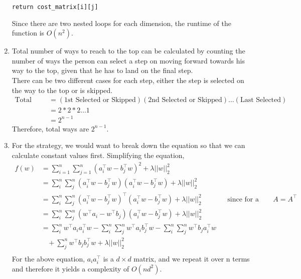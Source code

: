 \documentclass[12pt]{article}
\begin{document}
\begin{enumerate}[label=(\alph*)]
\begin{lstlisting}[basicstyle=\small]
    return cost_matrix[i][j]
\end{lstlisting}
Since there are two nested loops for each dimension, the runtime of the function is $O(n^2)$.\\
\linebreak
\item Total number of ways to reach to the top can be calculated by counting the number of ways the person can select a step on moving forward towards his way to the top, given that he has to land on the final step. \\
\linebreak
There can be two different cases for each step, either the step is selected on the way to the top or is skipped. \\
\begin{align*}
\text{Total ways} & = (\text{1st Selected or Skipped}) (\text{2nd Selected or Skipped}) \dots (\text{Last Selected}) \\ 
&= 2 * 2 * 2 \dots 1 \\
& = 2^{n-1}
\end{align*}
Therefore, total ways are $2^{n-1}$.\\
\linebreak
\item For the strategy, we would want to break down the equation so that we can calculate constant values first. Simplifying the equation, \\
\begin{align*}
f(w) & = \sum_{i=1}^{n}\sum_{j=1}^{n} (a_i^\top w - b_j^\top w)^2 + \lambda||w||_2^2 \\
& = \sum_i^n \sum_j^n (a_i^\top w - b_j^\top w) (a_i^\top w - b_j^\top w) + \lambda||w||_2^2 \\
& = \sum_i^n \sum_j^n (a_i^\top w - b_j^\top w)^\top (a_i^\top w - b_j^\top w) + \lambda||w||_2^2 && \text{since for a scaler, $A = A^\top$} \\
& = \sum_i^n \sum_j^n ( w^\top a_i - w^\top b_j ) (a_i^\top w - b_j^\top w) + \lambda||w||_2^2 \\
& = \sum_i^n w^\top a_i a_i^\top w - \sum_i^n \sum_j^n w^\top a_i b_j^\top w - \sum_i^n \sum_j^n w^\top b_j a_i^\top w \\ 
& \:\:\:\: + \sum_j^n w^\top b_j b_j^\top w + \lambda||w||_2^2 \\
\end{align*} 
For the above equation, $a_i a_i^\top$ is a $d \times d$ matrix, and we repeat it over n terms and therefore it yields a complexity of $O(nd^2)$. \\

\end{enumerate}
\end{document}
